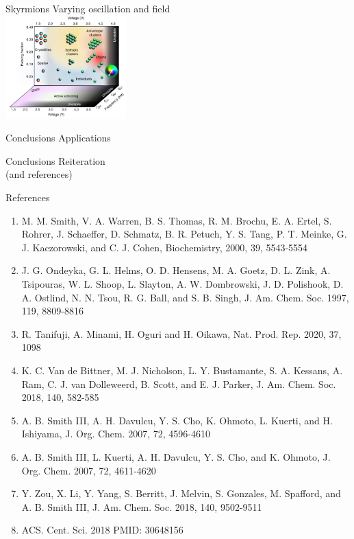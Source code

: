 \documentclass[t, 11pt, xcolor=dvipsnames]{beamer}
\begin{document}
\begin{frame}[plain]{Skyrmions}
  Varying oscillation and field \\
    \includegraphics[width=0.35\textwidth]{images/phase.png}
\end{frame}

\begin{frame}[plain]{Conclusions}
  Applications \\
\end{frame}

\begin{frame}[plain]{Conclusions}
  Reiteration \\
  (and references) \\
\end{frame}
\begin{frame}[plain]{References}
  \scriptsize
  \begin{enumerate}
  \item  M. M. Smith, V. A. Warren, B. S. Thomas, R. M. Brochu, E. A. Ertel, S. Rohrer, J. Schaeffer, D. Schmatz, B. R. Petuch, Y. S. Tang, P. T. Meinke, G. J. Kaczorowski, and C. J. Cohen, Biochemistry, 2000, 39, 5543-5554 \\
  \item J. G. Ondeyka, G. L. Helms, O. D. Hensens, M. A. Goetz, D. L. Zink, A. Tsipouras, W. L. Shoop, L. Slayton, A. W. Dombrowski, J. D. Polishook, D. A. Ostlind, N. N. Tsou, R. G. Ball, and S. B. Singh, J. Am. Chem. Soc. 1997, 119, 8809-8816 \\
  \item R. Tanifuji, A. Minami, H. Oguri and H. Oikawa, Nat. Prod. Rep. 2020, 37, 1098 \\
  \item K. C. Van de Bittner, M. J. Nicholson, L. Y. Bustamante, S. A. Kessans, A. Ram, C. J. van Dolleweerd, B. Scott, and E. J. Parker, J. Am. Chem. Soc. 2018, 140, 582-585 \\
  \item A. B. Smith III, A. H. Davulcu, Y. S. Cho, K. Ohmoto, L. Kuerti, and H. Ishiyama, J. Org. Chem. 2007, 72, 4596-4610 \\
  \item A. B. Smith III, L. Kuerti, A. H. Davulcu, Y. S. Cho, and K. Ohmoto, J. Org. Chem. 2007, 72, 4611-4620 \\
  \item Y. Zou, X. Li, Y. Yang, S. Berritt, J. Melvin, S. Gonzales, M. Spafford, and A. B. Smith III, J. Am. Chem. Soc. 2018, 140, 9502-9511 \\
  \item ACS. Cent. Sci. 2018 PMID: 30648156 \\
  \end{enumerate}
\end{frame}
\end{document}
